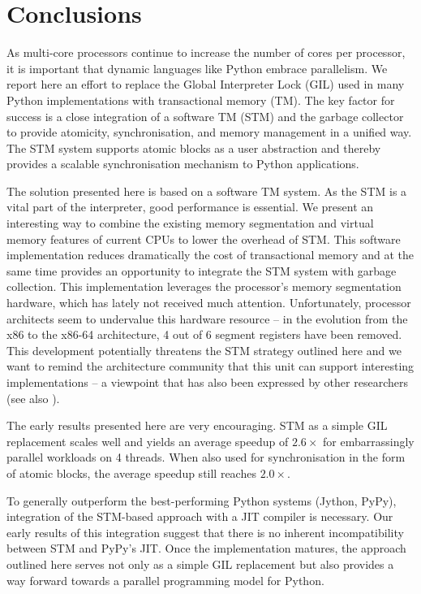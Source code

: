 \documentclass{sigplanconf}
\begin{document}
\section{Conclusions}

As multi-core processors continue to increase the number of cores per
processor, it is important that dynamic languages like Python embrace
parallelism.  We report here an effort to replace the Global
Interpreter Lock (GIL) used in many Python implementations with
transactional memory (TM). The key factor for success is a close
integration of a software TM (STM) and the garbage collector to
provide atomicity, synchronisation, and memory management in a unified
way.  The STM system supports atomic blocks as a user abstraction and
thereby provides a scalable synchronisation mechanism to Python
applications.


The solution presented here is based on a software TM system.  As the
STM is a vital part of the interpreter, good performance is
essential. We present an interesting way to combine the existing
memory segmentation and virtual memory features of current CPUs to
lower the overhead of STM. This software implementation reduces
dramatically the cost of transactional memory and at the same time
provides an opportunity to integrate the STM system with garbage
collection.  This implementation leverages the processor's memory
segmentation hardware, which has lately not received much attention.
Unfortunately, processor architects seem to
undervalue this hardware resource -- in the evolution from the x86 to
the x86{-}64 architecture, 4 out of 6 segment registers have been
removed. This development potentially threatens the STM strategy
outlined here and we want to remind the architecture community that
this unit can support interesting implementations -- a viewpoint that
has also been expressed by other researchers (see also
\cite{bennet10}).

The early results presented here are very encouraging. STM as a simple
GIL replacement scales well and yields an average speedup of $2.6\times$ for
embarrassingly parallel workloads on 4 threads.  When also used for
synchronisation in the form of atomic blocks, the average speedup
still reaches $2.0\times$.

To generally outperform the best-performing Python systems (Jython,
PyPy), integration of the STM-based approach with a JIT compiler is
necessary. Our early results of this integration suggest that there is
no inherent incompatibility between STM and PyPy's JIT.  Once the
implementation matures, the approach outlined here serves not only as a
simple GIL replacement but also provides a way forward towards a
parallel programming model for Python.
\end{document}
